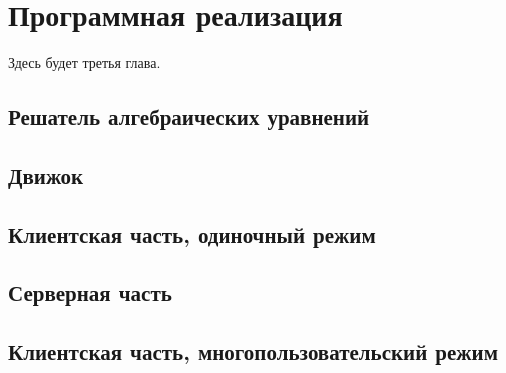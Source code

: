 \chapter{Программная реализация}

Здесь будет третья глава. \TODO

\section{Решатель алгебраических уравнений}

\TODO

\section{Движок}\label{engine}

\TODO

\section{Клиентская часть, одиночный режим}

\TODO

\section{Серверная часть}

\TODO

\section{Клиентская часть, многопользовательский режим}

\TODO
